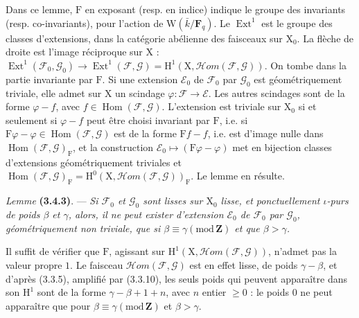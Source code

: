 \documentclass[11pt,leqno]{article}
\begin{document}
Dans ce lemme, \(\mathrm{F}\) en exposant (resp. en indice) indique le groupe des invariants (resp. co-invariants), pour l’action de \(\mathrm{W}(\bar{k}/\mathbf{F}_q)\). Le \(\operatorname{Ext}^1\) est le groupe des classes d’extensions, dans la catégorie abélienne des faisceaux sur \(\mathrm{X}_0\). La flèche de droite est l’image réciproque sur \(\mathrm{X}\) : \(\operatorname{Ext}^1(\mathscr{F}_0,\mathscr{G}_0)\to\operatorname{Ext}^1(\mathscr{F},\mathscr{G})=\mathrm{H}^1(\mathrm{X},\mathscr{H}\!om(\mathscr{F},\mathscr{G}))\). On tombe dans la partie invariante par \(\mathrm{F}\). Si une extension \(\mathscr{E}_0\) de \(\mathscr{F}_0\) par \(\mathscr{G}_0\) est géométriquement triviale, elle admet sur \(\mathrm{X}\) un scindage \(\varphi:\mathscr{F}\to\mathscr{E}\). Les autres scindages sont de la forme \(\varphi-f\), avec \(f\in\operatorname{Hom}(\mathscr{F},\mathscr{G})\). L’extension est triviale sur \(\mathrm{X}_0\) si et seulement si \(\varphi-f\) peut être choisi invariant par \(\mathrm{F}\), i.e. si \(\mathrm{F}\varphi-\varphi\in\operatorname{Hom}(\mathscr{F},\mathscr{G})\) est de la forme \(\mathrm{F}f-f\), i.e. est d’image nulle dans \(\operatorname{Hom}(\mathscr{F},\mathscr{G})_{\mathrm{F}}\), et la construction \(\mathscr{E}_0\mapsto(\mathrm{F}\varphi-\varphi)\) met en bijection classes d’extensions géométriquement triviales et \(\operatorname{Hom}(\mathscr{F},\mathscr{G})_{\mathrm{F}}=\mathrm{H}^0(\mathrm{X},\mathscr{H}\!om(\mathscr{F},\mathscr{G}))_{\mathrm{F}}\). Le lemme en résulte.

\textit{Lemme} \textbf{(3.4.3)}. — \textit{Si \(\mathscr{F}_0\) et \(\mathscr{G}_0\) sont lisses sur \(\mathrm{X}_0\) lisse, et ponctuellement \(\iota\)-purs de poids \(\beta\) et \(\gamma\), alors, il ne peut exister d’extension \(\mathscr{E}_0\) de \(\mathscr{F}_0\) par \(\mathscr{G}_0\), géométriquement non triviale, que si \(\beta\equiv\gamma(\mathrm{mod}\,\mathbf{Z})\) et que \(\beta>\gamma\).}

Il suffit de vérifier que \(\mathrm{F}\), agissant sur \(\mathrm{H}^1(\mathrm{X},\mathscr{H}\!om(\mathscr{F},\mathscr{G}))\), n’admet pas la valeur propre \(1\). Le faisceau \(\mathscr{H}\!om(\mathscr{F},\mathscr{G})\) est en effet lisse, de poids \(\gamma-\beta\), et d’après (3.3.5), amplifié par (3.3.10), les seuls poids qui peuvent apparaître dans son \(\mathrm{H}^1\) sont de la forme \(\gamma-\beta+1+n\), avec \(n\) entier \(\geq0\) : le poids \(0\) ne peut apparaître que pour \(\beta\equiv\gamma(\mathrm{mod}\,\mathbf{Z})\) et \(\beta>\gamma\).
\end{document}

